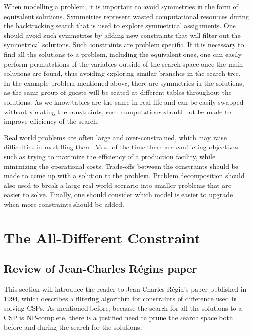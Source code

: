 \documentclass{l4proj}
\begin{document}
\noindent When modelling a problem, it is important to avoid symmetries in the form of equivalent solutions. Symmetries represent wasted computational resources during the backtracking search that is used to explore symmetrical assignments. One should avoid such symmetries by adding new constraints that will filter out the symmetrical solutions. Such constraints are problem specific. If it is necessary to find all the solutions to a problem, including the equivalent ones, one can easily perform permutations of the variables outside of the search space once the main solutions are found, thus avoiding exploring similar branches in the search tree. In the example problem mentioned above, there are symmetries in the solutions, as the same group of guests will be seated at different tables throughout the solutions. As we know tables are the same in real life and can be easily swapped without violating the constraints, such computations should not be made to improve efficiency of the search.

\noindent Real world problems are often large and over-constrained, which may raise difficulties in modelling them. Most of the time there are conflicting objectives such as trying to maximize the efficiency of a production facility, while minimizing the operational costs. Trade-offs between the constraints should be made to come up with a solution to the problem. Problem decomposition should also used to break a large real world scenario into smaller problems that are easier to solve. Finally, one should consider which model is easier to upgrade when more constraints should be added.

\chapter{The All-Different Constraint}
\label{chap3alldiffconstraint}

\section{Review of Jean-Charles R\'egin\textquotesingle s paper}
\noindent This section will introduce the reader to Jean-Charles R\'egin's paper \cite{regin1994filtering} published in 1994, which describes a filtering algorithm for constraints of difference used in solving CSPs. As mentioned before, because the search for all the solutions to a CSP is NP-complete, there is a justified need to prune the search space both before and during the search for the solutions.
\end{document}
